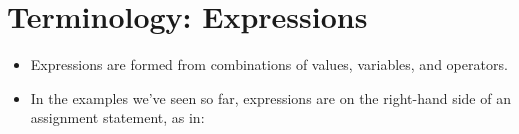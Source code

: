 \documentclass[letterpaper,10pt,english]{sphinxmanual}
\begin{document}
\section{Terminology: Expressions}
\label{\detokenize{lecture_notes/lec02_calculator:terminology-expressions}}\begin{itemize}
\item {} 
Expressions are formed from combinations of values, variables, and
operators.

\item {} 
In the examples we’ve seen so far, expressions are on the
right-hand side of an assignment statement, as in:

\begin{sphinxVerbatim}[commandchars=\\\{\}]
            
\end{sphinxVerbatim}

\end{itemize}
\end{document}
